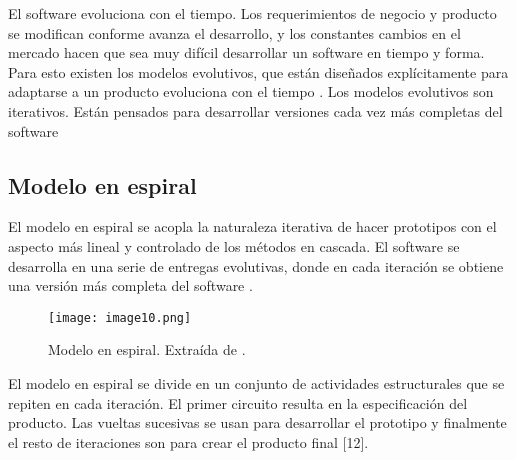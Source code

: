 \par El software evoluciona con el tiempo. Los requerimientos de negocio y producto se modifican conforme avanza el desarrollo, y los constantes cambios en el mercado hacen que sea muy difícil desarrollar un software en tiempo y forma. Para esto existen los modelos evolutivos, que están diseñados explícitamente para adaptarse a un producto evoluciona con el tiempo \cite{pressmanIngenieriaSoftwareEnfoque2013}. Los modelos evolutivos son iterativos. Están pensados para desarrollar versiones cada vez más completas del software
%
%
\subsection{Modelo en espiral}
\par El modelo en espiral se acopla la naturaleza iterativa de hacer prototipos con el aspecto más lineal y controlado de los métodos en cascada. El software se desarrolla en una serie de entregas evolutivas, donde en cada iteración se obtiene una versión más completa del software \cite{pressmanIngenieriaSoftwareEnfoque2013}.
\begin{figure}[H]
  \centering
  \texttt{[image: image10.png]}
  \caption{Modelo en espiral. Extraída de \cite{pressmanIngenieriaSoftwareEnfoque2013}.}
  \label{fig:x Modelo en espiral}
\end{figure}
\par El modelo en espiral se divide en un conjunto de actividades estructurales que se repiten en cada iteración. El primer circuito resulta en la especificación del producto. Las vueltas sucesivas se usan para desarrollar el prototipo y finalmente el resto de iteraciones son para crear el producto final [12].